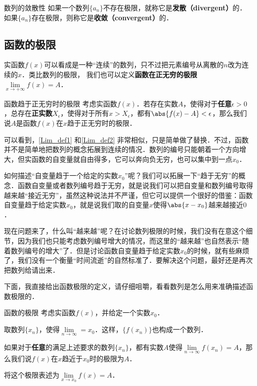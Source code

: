 \begin{definition}{数列的敛散性}\label{Lim_def4}
如果一个数列$\{a_n\}$不存在极限，就称它是\textbf{发散（divergent）}的．如果$\{a_n\}$存在极限，则称它是\textbf{收敛（convergent）}的．
\end{definition}

\subsection{函数的极限}
实函数$f(x)$可以看成是一种“连续”的数列，只不过把元素编号从离散的$n$改为连续的$x$．类比数列的极限， 我们也可以定义\textbf{函数在正无穷的极限} $\lim\limits_{x\to +\infty} f(x) = A$．

\begin{definition}{函数趋于正无穷时的极限}\label{Lim_def1}
考虑实函数$f(x)$．若存在实数$A$，使得对于\textbf{任意}$\epsilon>0$，总存在\textbf{正实数}$X_\epsilon$，使得对于所有$x>X_\epsilon$，都有$\abs{f(x)-A}<\epsilon$，那么我们说$A$是函数$f(x)$在$x$趋于正无穷时的极限．
\end{definition}

可以看到，\autoref{Lim_def1} 和\autoref{Lim_def2} 非常相似，只是简单做了替换．不过，函数并不是简单地把数列的概念拓展到连续的情况．数列的编号只能朝着一个方向增大，但实函数的自变量就自由得多，它可以奔向负无穷，也可以集中到一点$x_0$．

如何描述“自变量趋于一个给定的实数$x_0$”呢？我们可以拓展一下“趋于无穷”的概念．函数自变量或者数列编号趋于无穷，就是说我们可以把自变量和数列编号取得越来越“接近无穷”，虽然这种说法并不严谨，但它可以提供一个很好的借鉴：函数自变量趋于给定实数$x_0$，就是说我们取的自变量$x$使得$\abs{x-x_0}$越来越接近$0$．

现在问题来了，什么叫“越来越”呢？在讨论数列极限的时候，我们没有在意这个细节，因为我们也只能考虑数列编号增大的情况，而这里的“越来越”也自然表示“随着数列编号的增大”了．但是讨论函数自变量趋于给定实数$x_0$的时候，就有些麻烦了，我们没有一个衡量“时间流逝”的自然标准了．要解决这个问题，最好还是再次把数列给请出来．

下面，我直接给出函数极限的定义，请仔细咀嚼，看看数列是怎么用来准确描述函数极限的．

\begin{definition}{函数的极限}\label{Lim_def3}
考虑实函数$f(x)$，并给定一个实数$x_0$．

取数列$\{x_n\}$，使得$\lim\limits_{n\to\infty}=x_0$．这样，$\{f(x_n)\}$也构成一个数列．

如果对于\textbf{任意}的满足上述要求的数列$\{x_n\}$，都有实数$A$使得$\lim\limits_{n\to\infty}f(x_n)=A$，那么我们说$f(x)$在$x$趋近于$x_0$时的极限为$A$．

将这个极限表述为$\lim\limits_{x\to x_0}f(x)=A$．
\end{definition}

